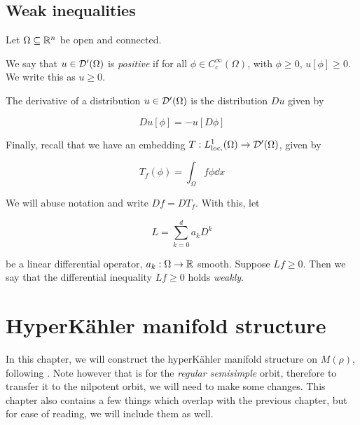 \documentclass{report}
\begin{document}
\begin{subappendices}
    \section{Weak inequalities}
    
    \label{sec:weak-inequalities}

    Let \(\Omega \subseteq \mathbb{R}^n\) be open and connected.
    
    \begin{definition}
        [positive]
        We say that \(u \in \mathcal{D}'(\Omega)\) is \emph{positive} if for all \(\phi \in C_c^\infty(\Omega)\), with \(\phi \ge 0\), \(u[\phi] \ge 0\). We write this as \(u \ge 0\). 
    \end{definition}
    
    \begin{definition}
        [derivative]
    
        The derivative of a distribution \(u \in \mathcal{D}'(\Omega)\) is the distribution \(Du\) given by
    
        \[Du[\phi] = -u[D\phi]\]
    \end{definition}
    
    Finally, recall that we have an embedding \(T : L^1_\text{loc.}(\Omega) \to \mathcal{D}'(\Omega)\), given by
    
    \[T_f(\phi) = \int_\Omega f\phi \dd x\]
    
    We will abuse notation and write \(Df = DT_f\). With this, let
    
    \[L = \sum_{k=0}^d a_k D^k\]
    
    be a linear differential operator, \(a_k : \Omega \to \mathbb{R}\) smooth. Suppose \(Lf \ge 0\). Then we say that the differential inequality \(Lf \ge 0\) holds \emph{weakly}.
    

\end{subappendices}

\chapter{HyperK\"ahler manifold structure}

\label{chapter:Kronheimer-hyperkahler}

In this chapter, we will construct the hyperK\"ahler manifold structure on \(M(\rho)\), following \cite{kronheimer_hyper-kahlerian_1990}. Note however that \cite{kronheimer_hyper-kahlerian_1990} is for the \emph{regular semisimple} orbit, therefore to transfer it to the nilpotent orbit, we will need to make some changes. This chapter also contains a few things which overlap with the previous chapter, but for ease of reading, we will include them as well.
\end{document}
